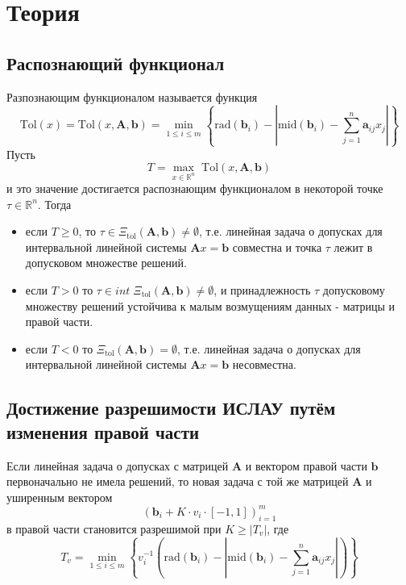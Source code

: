 \section{Теория}
\subsection{Распознающий функционал}
Разпознающим функционалом называется функция
\begin{equation}
    \mathrm{Tol}(x)=\mathrm{Tol}(x,\mathbf{A},\mathbf{b})=\min_{1\leq i\leq m}\left\{\mathrm{rad}(\mathbf{b}_i)-\left|\mathrm{mid}(\mathbf{b}_i)-\sum_{j=1}^n \mathbf{a}_{ij}x_j\right|\right\}
\end{equation}
Пусть
\begin{equation}
T=\max_{x\in \mathbb{R}^n} \;\mathrm{Tol}(x, \mathbf{A},\mathbf{b})
\end{equation}
и это значение достигается распознающим функционалом в некоторой точке $\tau\in \mathbb{R}^n$. Тогда
\begin{itemize}
    \item если $T\geq0$, то $\tau\in\Xi_{\mathrm{tol}}(\textbf{A},\textbf{b})\neq  \emptyset$, т.е. линейная задача о допусках для интервальной линейной системы $\textbf{A}x=\textbf{b}$ совместна и точка $\tau$ лежит в допусковом множестве решений.
    \item если $T>0$ то $\tau\in int \;\Xi_{\mathrm{tol}}(\textbf{A},\textbf{b})\neq  \emptyset$, и принадлежность $\tau$ допусковому множеству решений устойчива к малым возмущениям данных - матрицы и правой части.
    \item если $T<0$ то $\Xi_{\mathrm{tol}}(\textbf{A},\textbf{b})=\emptyset$,  т.е. линейная задача о допусках для интервальной линейной системы $\textbf{A}x=\textbf{b}$ несовместна.
\end{itemize}
\subsection{Достижение разрешимости ИСЛАУ путём изменения правой части}
Если линейная задача о допусках с матрицей $\textbf{A}$ и вектором правой части $\textbf{b}$ первоначально не имела решений, то новая задача с той же матрицей  $\textbf{A}$ и уширенным вектором
\begin{equation}
    (\textbf{b}_i+K\cdot v_i\cdot [-1,1])_{i=1}^m
\end{equation}
в правой части становится разрешимой при $K\geq |T_v|$, где
\begin{equation}
    T_v=\min_{1\leq i\leq m}\left\{v_i^{-1}\left(\mathrm{rad}(\mathbf{b}_i)-\left|\mathrm{mid}(\mathbf{b}_i)-\sum_{j=1}^n \mathbf{a}_{ij}x_j\right|\right)\right\}
\end{equation}
